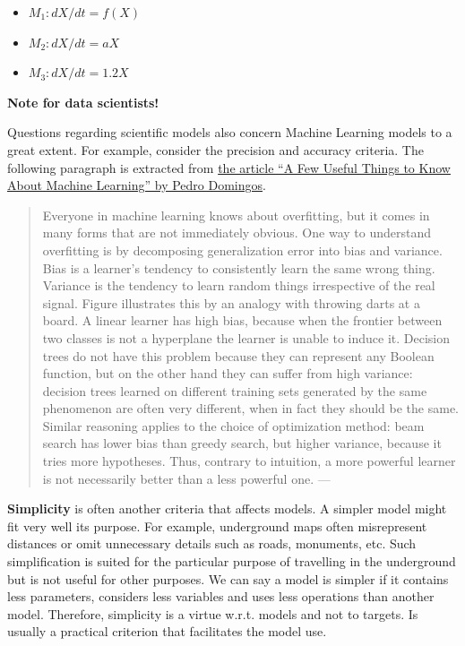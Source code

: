 \documentclass[
]{book}
\providecommand{\tightlist}{%
  \setlength{\itemsep}{0pt}\setlength{\parskip}{0pt}}
\begin{document}
\begin{itemize}
\tightlist
\item
  \(M_1: dX/dt = f(X)\)
\item
  \(M_2: dX/dt = aX\)
\item
  \(M_3: dX/dt = 1.2X\)
\end{itemize}

\begin{tipbox}

\textbf{Note for data scientists!}

Questions regarding scientific models also concern Machine Learning models to a great extent. For example, consider the precision and accuracy criteria. The following paragraph is extracted from \href{https://dl.acm.org/doi/pdf/10.1145/2347736.2347755}{the article ``A Few Useful Things to Know About Machine Learning'' by Pedro Domingos}.

\begin{quote}
Everyone in machine learning knows about overfitting, but it comes in many forms that are not immediately obvious. One way to understand overfitting is by decomposing generalization error into bias and variance. Bias is a learner's tendency to consistently learn the same wrong thing. Variance is the tendency to learn random things irrespective of the real signal. Figure illustrates this by an analogy with throwing darts at a board. A linear learner has high bias, because when the frontier between two classes is not a hyperplane the learner is unable to induce it. Decision trees do not have this problem because they can represent any Boolean function, but on the other hand they can suffer from high variance: decision trees learned on different training sets generated by the same phenomenon are often very different, when in fact they should be the same. Similar reasoning applies to the choice of optimization method: beam search has lower bias than greedy search, but higher variance, because it tries more hypotheses. Thus, contrary to intuition, a more powerful learner is not necessarily better than a less powerful one. --- \citep{domingos2012few}
\end{quote}

\end{tipbox}

\textbf{Simplicity} is often another criteria that affects models. A simpler model might fit very well its purpose. For example, underground maps often misrepresent distances or omit unnecessary details such as roads, monuments, etc. Such simplification is suited for the particular purpose of travelling in the underground but is not useful for other purposes. We can say a model is simpler if it contains less parameters, considers less variables and uses less operations than another model. Therefore, simplicity is a virtue w.r.t. models and not to targets. Is usually a practical criterion that facilitates the model use.
\end{document}
